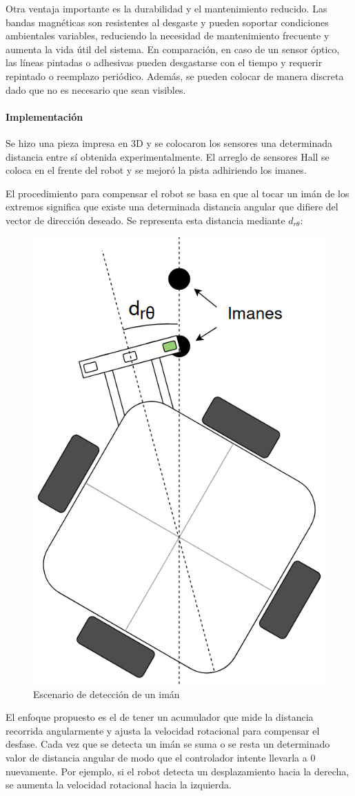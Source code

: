 Otra ventaja importante es la durabilidad y el mantenimiento reducido. Las bandas magnéticas son resistentes al desgaste y pueden soportar condiciones ambientales variables, reduciendo la necesidad de mantenimiento frecuente y aumenta la vida útil del sistema. En comparación, en caso de un sensor óptico, las líneas pintadas o adhesivas pueden desgastarse con el tiempo y requerir repintado o reemplazo periódico. Además, se pueden colocar de manera discreta dado que no es necesario que sean visibles.


\paragraph{Implementación} \mbox{} \vspace{8pt}

Se hizo una pieza impresa en 3D y se colocaron los sensores una determinada distancia entre sí obtenida experimentalmente. El arreglo de sensores Hall se coloca en el frente del robot y se mejoró la pista adhiriendo los imanes.

El procedimiento para compensar el robot se basa en que al tocar un imán de los extremos significa que existe una determinada distancia angular que difiere del vector de dirección deseado. Se representa esta distancia mediante $d_{r\theta}$:

\begin{figure}[H]
    \centering
    \includegraphics[width=0.4\linewidth]{images/robot_desplazamiento_angular_toca_iman.png}
    \caption{Escenario de detección de un imán}
    \label{fig:deteccionimanrobot}
\end{figure}

El enfoque propuesto es el de tener un acumulador que mide la distancia recorrida angularmente y ajusta la velocidad rotacional para compensar el desfase. Cada vez que se detecta un imán se suma o se resta un determinado valor de distancia angular de modo que el controlador intente llevarla a 0 nuevamente. Por ejemplo, si el robot detecta un desplazamiento hacia la derecha, se aumenta la velocidad rotacional hacia la izquierda.

